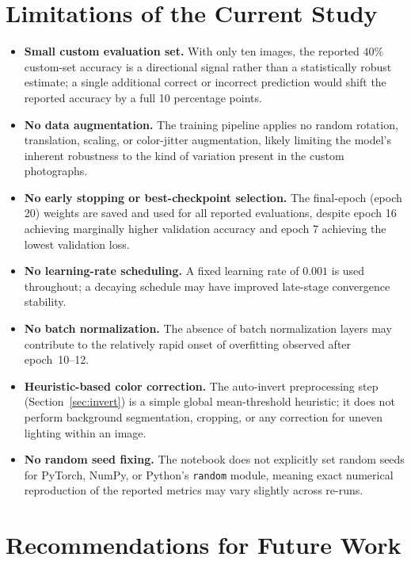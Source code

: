 \documentclass[12pt,a4paper]{report}
\begin{document}
\section{Limitations of the Current Study}
\begin{itemize}
    \item \textbf{Small custom evaluation set.} With only ten images, the reported $40\%$ custom-set accuracy is a directional signal rather than a statistically robust estimate; a single additional correct or incorrect prediction would shift the reported accuracy by a full 10 percentage points.
    \item \textbf{No data augmentation.} The training pipeline applies no random rotation, translation, scaling, or color-jitter augmentation, likely limiting the model's inherent robustness to the kind of variation present in the custom photographs.
    \item \textbf{No early stopping or best-checkpoint selection.} The final-epoch (epoch 20) weights are saved and used for all reported evaluations, despite epoch 16 achieving marginally higher validation accuracy and epoch 7 achieving the lowest validation loss.
    \item \textbf{No learning-rate scheduling.} A fixed learning rate of $0.001$ is used throughout; a decaying schedule may have improved late-stage convergence stability.
    \item \textbf{No batch normalization.} The absence of batch normalization layers may contribute to the relatively rapid onset of overfitting observed after epoch~10--12.
    \item \textbf{Heuristic-based color correction.} The auto-invert preprocessing step (Section~\ref{sec:invert}) is a simple global mean-threshold heuristic; it does not perform background segmentation, cropping, or any correction for uneven lighting within an image.
    \item \textbf{No random seed fixing.} The notebook does not explicitly set random seeds for PyTorch, NumPy, or Python's \texttt{random} module, meaning exact numerical reproduction of the reported metrics may vary slightly across re-runs.
\end{itemize}

\section{Recommendations for Future Work}
\end{document}
